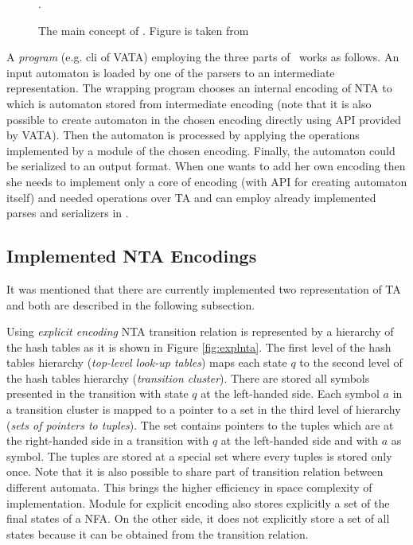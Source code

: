 \begin{figure}[bt]
\begin{center}

		\caption{The main concept of \vata. Figure is taken from \cite{libvata}}.
		\label{fig:vata}
\end{center}
\end{figure}

A \emph{program} (e.g. cli of VATA) employing the three parts of \vata\ works as follows.
An input automaton is loaded by one of the parsers to an intermediate representation.
The wrapping program chooses an internal encoding of NTA to which is automaton stored
from intermediate encoding (note that it is also
possible to create automaton in the chosen encoding directly using API provided by VATA).
Then the automaton is processed by applying the operations implemented by a module of the chosen encoding.
Finally, the automaton could be serialized to an output format.
When one wants to add her own encoding then she needs to implement only a core of encoding (with API for creating automaton itself)
and needed operations over TA and can employ already implemented parses and serializers in \vata.

\subsection{Implemented NTA Encodings}

It was mentioned that there are currently implemented two representation of TA and both are described in the following subsection.

Using \emph{explicit encoding} NTA transition relation is represented by a hierarchy of the hash tables as it is shown in Figure \ref{fig:explnta}.
The first level of the hash tables hierarchy (\emph{top-level look-up tables}) maps each state $q$ to 
the second level of the hash tables hierarchy (\emph{transition cluster}).
There are stored all symbols presented in the transition with state $q$ at the left-handed side.
Each symbol $a$ in a transition cluster is mapped to a pointer to a set in the third level of hierarchy (\emph{sets of pointers to tuples}).
The set contains pointers to the tuples which are at the right-handed side in
a transition with $q$ at the left-handed side and with $a$ as symbol.
The tuples are stored at a special set where every tuples is stored only once.
Note that it is also possible to share part of transition relation between different automata.
This brings the higher efficiency in space complexity of implementation.
Module for explicit encoding also stores explicitly a set of the final states of a NFA.
On the other side, it does not explicitly store a set of all states because it can be obtained from the transition relation.

